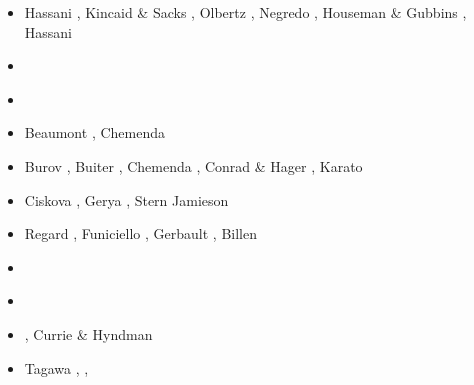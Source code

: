 \begin{scriptsize}
\begin{itemize}
\item[\nineteenninetyseven] Hassani \etal \cite{hajc97}, Kincaid \& Sacks \cite{kisa97}, 
                            Olbertz \etal \cite{olwh97}, Negredo \etal \cite{nesg97}, 
                            Houseman \& Gubbins \cite{hogu97}, Hassani \etal \cite{hajc97}
\item[\nineteenninetyeight] \cite{itki98}\cite{buwg98}
                            \cite{brmy98}\cite{jabf98}
                            \cite{wabb98}
\item[\nineteenninetynine] \cite{hagu99}\cite{befo99}
                           \cite{bumo99}\cite{roda99}
                           \cite{elbp99}\cite{scmr99}
                           \cite{elbe99}\cite{beep99}
                           \cite{nesb99}
\item[\twothousand] \cite{tesc00}\cite{brky00}
                    Beaumont \etal \cite{bemh00}, Chemenda \etal \cite{chlb00}
\item[\twothousandone] Burov \etal \cite{bujl01}, Buiter \etal \cite{bugw01},
                       Chemenda \etal \cite{chys01}, Conrad \& Hager \cite{coha01}, 
                       Karato \etal \cite{kary01}
\item[\twothousandtwo] Ciskova \etal \cite{civv02},
                       Gerya \etal \cite{gesp02}, Stern \cite{ster02}
                       Jamieson \etal \cite{jabn02}
\item[\twothousandthree] Regard \etal \cite{refm03}, Funiciello \etal \cite{fumr03}, 
                         Gerbault \etal \cite{gehd03}, Billen \etal \cite{bigs03}
\item[\twothousandfour] \cite{toba04}\cite{bocj04}
                        \cite{bejn04}\cite{tobj04}
                        \cite{sche04}\cite{sche04b}
                        \cite{enwi04}\cite{geys04}
\item[\twothousandfive] \cite{jalo05}\cite{lahb05}
                        \cite{gowo05}\cite{enbs05}
                        \cite{artd05}\cite{gowo05}
                        \cite{mage05}\cite{stge05}
                        \cite{sche05}\cite{lahb05}
\item[\twothousandsix] \cite{degw06}\cite{rohu06}
                       \cite{masr06}\cite{gest06}
                       \cite{fump06}\cite{pibf06}
                       \cite{stfs06}\cite{libi06}
                       \cite{hapf06}\cite{sobk06}
                       \cite{syab06}, Currie \& Hyndman \cite{cuhy06}
\item[\twothousandseven] Tagawa \etal \cite{tank07}, \cite{artd07},

\end{itemize}
\end{scriptsize}
